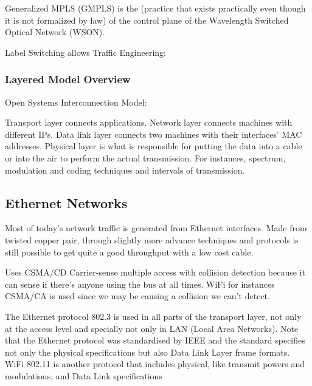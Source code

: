 Generalized MPLS (GMPLS) is the  (practice that exists practically even though it is not formalized by law) of the control plane of the Wavelength Switched Optical Network (WSON).

Label Switching allows Traffic Engineering:





\subsubsection{Layered Model Overview}
Open Systems Interconnection Model:


Transport layer connects applications.
Network layer connects machines with different IPs.
Data link layer connects two machines with their interfaces' MAC addresses.
Physical layer is what is responsible for putting the data into a cable or into the air to perform the actual transmission. For instances, spectrum, modulation and coding techniques and intervals of transmission.









\subsection{Ethernet Networks}

Most of today's network traffic is generated from Ethernet interfaces. Made from twisted copper pair, through slightly more advance techniques and protocols is still possible to get quite a good throughput with a low cost cable.

Uses CSMA/CD Carrier-sense multiple access with collision detection because it can sense if there's anyone using the bus at all times. WiFi for instances CSMA/CA is used since we may be causing a collision we can't detect.

The Ethernet protocol 802.3 is used in all parts of the transport layer, not only at the access level and specially not only in LAN (Local Area Networks). Note that the Ethernet protocol was standardised by IEEE and the standard specifies not only the physical specifications but also Data Link Layer frame formats.
WiFi 802.11 is another protocol that includes physical, like transmit powers and modulations, and Data Link specifications 

